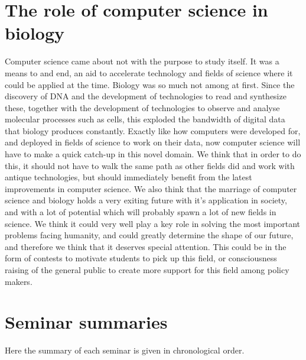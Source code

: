 \documentclass[a4paper]{article}
\begin{document}
\section{The role of computer science in biology}
Computer science came about not with the purpose to study itself. It was a means to and end, an aid to accelerate technology and fields of science where it could be applied at the time. Biology was so much not among at first. Since the discovery of DNA and the development of technologies to read and synthesize these, together with the development of technologies to observe and analyse molecular processes such as cells, this exploded the bandwidth of digital data that biology produces constantly. Exactly like how computers were developed for, and deployed in fields of science to work on their data, now computer science will have to make a quick catch-up in this novel domain. We think that in order to do this, it should not have to walk the same path as other fields did and work with antique technologies, but should immediately benefit from the latest improvements in computer science. We also think that the marriage of computer science and biology holds a very exiting future with it's application in society, and with a lot of potential which will probably spawn a lot of new fields in science. We think it could very well play a key role in solving the most important problems facing humanity, and could greatly determine the shape of our future, and therefore we think that it deserves special attention. This could be in the form of contests to motivate students to pick up this field, or consciousness raising of the general public to create more support for this field among policy makers.
\appendix

\section{Seminar summaries}
\label{abstracts}
Here the summary of each seminar is given in chronological order.





\end{document}
